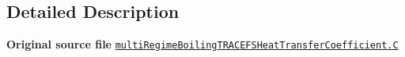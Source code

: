 \subsection{Detailed Description}
{\bfseries Original source file} \href{../../../home/carlo/data/GeN-Foam/GeN-Foam_ffn/GeN-Foam/GeN-Foam/classes/thermalHydraulics/src/physicsModels/heatTransferModels/FSHeatTransferCoefficientModels/multiRegimeBoilingTRACE/multiRegimeBoilingTRACEFSHeatTransferCoefficient.C}{\tt multi\+Regime\+Boiling\+T\+R\+A\+C\+E\+F\+S\+Heat\+Transfer\+Coefficient.\+C} 